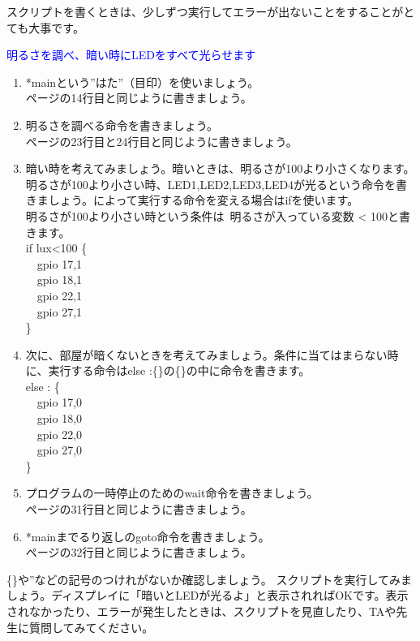 \begin{enumerate}
\begin{enumerate}
スクリプトを書くときは、少しずつ実行してエラーが出ないことをすることがとても大事です。
\end{enumerate}
\textcolor{blue}{\item 明るさを調べ、暗い時にLEDをすべて光らせます}
\begin{enumerate}
\item *mainという”はた”（目印）を使いましょう。\\
\pageref{sensors.hsp}ページの14行目と同じように書きましょう。
\item 明るさを調べる命令を書きましょう。\\
\pageref{sensors.hsp}ページの23行目と24行目と同じように書きましょう。
\item 暗い時を考えてみましょう。暗いときは、明るさが100より小さくなります。
明るさが100より小さい時、LED1,LED2,LED3,LED4が光るという命令を書きましょう。によって実行する命令を変える場合はifを使います。\\
明るさが100より小さい時という条件は\ 明るさが入っている変数 < 100と書きます。\\
if lux<100 \{\\
\ \ gpio 17,1\\
\ \ gpio 18,1\\
\ \ gpio 22,1\\
\ \ gpio 27,1\\
\}
\item 次に、部屋が暗くないときを考えてみましょう。条件に当てはまらない時に、実行する命令はelse :\{\}の\{\}の中に命令を書きます。\\
else : \{\\
\ \ gpio 17,0\\
\ \ gpio 18,0\\
\ \ gpio 22,0\\
\ \ gpio 27,0\\
\}
\item プログラムの一時停止のためのwait命令を書きましょう。\\
\pageref{sensors.hsp}ページの31行目と同じように書きましょう。
\item *mainまでるり返しのgoto命令を書きましょう。\\
\pageref{sensors.hsp}ページの32行目と同じように書きましょう。
\end{enumerate}
\item  \{\}や”などの記号のつけれがないか確認しましょう。
スクリプトを実行してみましょう。ディスプレイに「暗いとLEDが光るよ」と表示されればOKです。表示されなかったり、エラーが発生したときは、スクリプトを見直したり、TAや先生に質問してみてください。
\end{enumerate}

\begin{tcolorbox}[title=\useOmetoi]
    \begin{enumerate}
    \end{enumerate}
\end{tcolorbox}

